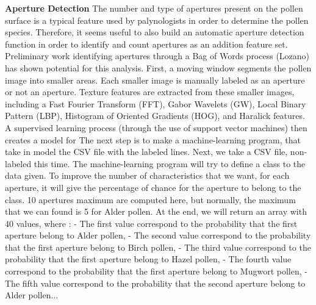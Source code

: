 \textbf{Aperture Detection}
The number and type of apertures present on the pollen surface is a typical feature used by palynologists in order to determine the pollen species. Therefore, it seems useful to also build an automatic aperture detection function in order to identify and count apertures as an addition feature set. Preliminary work identifying apertures through a Bag of Words process (Lozano) has shown potential for this analysis.
First, a moving window segments the pollen image into smaller areas. Each smaller image is manually labeled as an aperture or not an aperture. Texture features are extracted from these smaller images, including a Fast Fourier Transform (FFT), Gabor Wavelets (GW), Local Binary Pattern (LBP), Histogram of Oriented Gradients (HOG), and Haralick features. A supervised learning process (through the use of support vector machines) then creates a model for 
	The next step is to make a machine-learning program, that take in model the CSV file with the labeled lines. Next, we take a CSV file, non-labeled this time. The machine-learning program will try to define a class to the data given. To improve the number of characteristics that we want, for each aperture, it will give the percentage of chance for the aperture to belong to the class. 10 apertures maximum are computed here, but normally, the maximum that we can found is 5 for Alder pollen. At the end, we will return an array with 40 values, where :
- The first value correspond to the probability that the first aperture belong to Alder pollen,
- The second value correspond to the probability that the first aperture belong to Birch pollen,
- The third value correspond to the probability that the first aperture belong to Hazel pollen,
- The fourth value correspond to the probability that the first aperture belong to Mugwort pollen,
- The fifth value correspond to the probability that the second aperture belong to Alder pollen...
    
    
  
